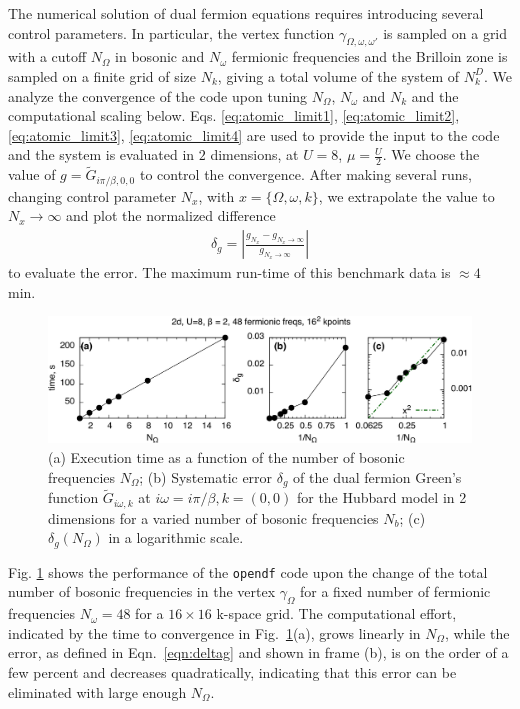 \documentclass[3p,times,procedia]{elsarticle}
\begin{document}
The numerical solution of dual fermion equations requires introducing several control parameters. In particular,
the vertex function $\gamma_{\Omega,\omega,\omega'}$ is sampled on a grid with a cutoff $N_\Omega$ in bosonic and $N_{\omega}$ fermionic frequencies and the Brilloin zone is sampled on a finite grid of size $N_k$, giving a total volume of the system of $N_k^D$. We analyze the convergence of the code upon tuning $N_{\Omega}$, $N_{\omega}$ and $N_k$ and the computational scaling below. Eqs. \ref{eq:atomic_limit1}, \ref{eq:atomic_limit2}, \ref{eq:atomic_limit3}, \ref{eq:atomic_limit4} are used to provide the input to the code and the system is evaluated in $2$ dimensions, at $U=8$, $\mu = \frac{U}{2}$. We choose the value of $g= \tilde G_{i\pi / \beta, 0, 0}$ to control the convergence. After making several runs, changing control parameter $N_x$, with $x = \{ \Omega, \omega, k \}$, we extrapolate the value to $N_x \to \infty$ and plot the normalized difference 
\begin{align}\label{eqn:deltag}
\delta_{g} = \left|\frac{g_{N_x} - g_{N_x \to \infty}}{g_{N_x \to \infty}}\right|
\end{align}
to evaluate the error. The maximum run-time of this benchmark data is $\approx 4$ min.

\begin{figure}[ht]
\includegraphics[width=1.0\columnwidth]{time_bfreqs.pdf}
\caption{(a) Execution time as a function of the number of bosonic frequencies $N_{\Omega}$; (b) Systematic error $\delta_g$ of the dual fermion Green's function $\tilde G_{i\omega, k}$ at $i\omega = i\pi / \beta, k = (0,0)$ for the Hubbard model in 2 dimensions for a varied number of bosonic frequencies $N_b$; (c) $\delta_g(N_{\Omega})$ in a logarithmic scale. }
\label{fig:benchmark_b}
\end{figure}

Fig. \ref{fig:benchmark_b} shows the performance of the \texttt{opendf} code upon the change of the total number of bosonic frequencies in the vertex $\gamma_{\Omega}$ for a fixed number of fermionic frequencies $N_{\omega}=48$ for a $16 \times 16$ k-space grid. The computational effort, indicated by the time to convergence in Fig.~\ref{fig:benchmark_b}(a), grows linearly in $N_{\Omega}$, while the error, as defined in Eqn.~\ref{eqn:deltag} and shown in frame (b), is on the order of a few percent and decreases quadratically, indicating that this error can be eliminated with large enough $N_{\Omega}$.
\end{document}
